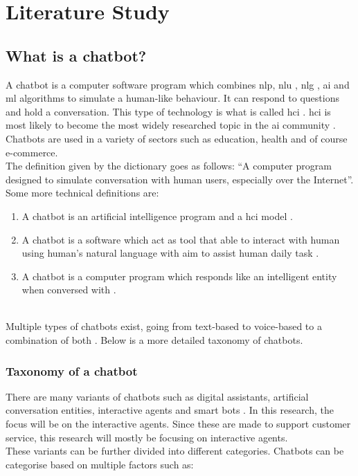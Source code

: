 \mainmatter
\pagestyle{headings}

\chapter{Literature Study}
\label{ch:literature-study}

\section{What is a chatbot?}
A chatbot is a computer software program which combines \acrfull{nlp}, \acrfull{nlu} , \acrfull{nlg} \citep{Adamopoulou2020}, \acrfull{ai} and \acrfull{ml} algorithms to simulate a human-like behaviour. It can respond to questions and hold a conversation. This type of technology is what is called \acrfull{hci} \citep{Adamopoulou2020}.  \acrshort{hci} is most likely to become the most widely researched topic in the \acrshort{ai} community \citep{Bansal2018}. Chatbots are used in a variety of sectors such as education, health and of course e-commerce.\\
\break
The definition given by the dictionary goes as follows: “A computer program designed to simulate conversation with human users, especially over the Internet”\citep{Lexico2022}. Some more technical definitions are:
\begin{enumerate}
	\item A chatbot is an artificial intelligence program and a \acrfull{hci} model \citep{Bansal2018}.
	\item A chatbot is a software which act as tool that able to interact with human using human’s natural language with aim to assist human daily task \citep{Muizzah2021}.
	\item A chatbot  is  a  computer  program  which  responds  like  an  intelligent  entity when  conversed  with \citep{Khanna2015}.
\end{enumerate}\\
\break
Multiple types of chatbots exist, going from text-based to voice-based to a combination of both \citep{Radziwil2021}. Below is a more detailed taxonomy of chatbots.\\

\subsection{Taxonomy of a chatbot}
There are many variants of chatbots such as digital assistants, artificial conversation entities, interactive agents and smart bots \citep{Adamopoulou2020}. In this research, the focus will be on the interactive agents. Since these are made to support customer service, this research will mostly be focusing on interactive agents.\\
\break
These variants can be further divided into different categories. Chatbots can be categorise based on multiple factors such as:\\

